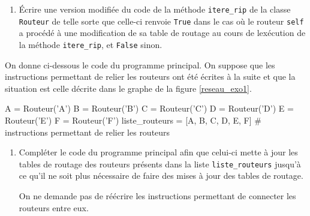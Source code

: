 \begin{enumerate}[series=monDS, resume]
    \item Écrire une version modifiée du code de la méthode \verb|itere_rip| de la classe \verb|Routeur| de telle sorte que celle-ci renvoie \verb|True| dans le cas où le routeur \verb|self| a procédé à une modification de sa table de routage au cours de lexécution de la méthode \verb|itere_rip|, et \verb|False| sinon.

\end{enumerate}

On donne ci-dessous le code du programme principal. On suppose que les instructions permettant de relier les routeurs ont été écrites à la suite et que la situation est celle décrite dans le graphe de la figure \ref{reseau_exo1}.

    \begin{CodePythontexAlt}[TaillePolice=\large, Largeur=1\linewidth,Centre,Lignes=true,PremLigne=1]{}
A = Routeur('A') 
B = Routeur('B') 
C = Routeur('C') 
D = Routeur('D') 
E = Routeur('E') 
F = Routeur('F') 
liste_routeurs = [A, B, C, D, E, F]
# instructions permettant de relier les routeurs
\end{CodePythontexAlt}

\begin{enumerate}[series=monDS, resume]
    \item Compléter le code du programme principal afin que celui-ci mette à jour les tables de routage des routeurs présents dans la liste \verb|liste_routeurs| jusqu’à ce qu’il ne soit plus nécessaire de faire des mises à jour des tables de routage.

    On ne demande pas de réécrire les instructions permettant de connecter les routeurs entre eux.

\end{enumerate}